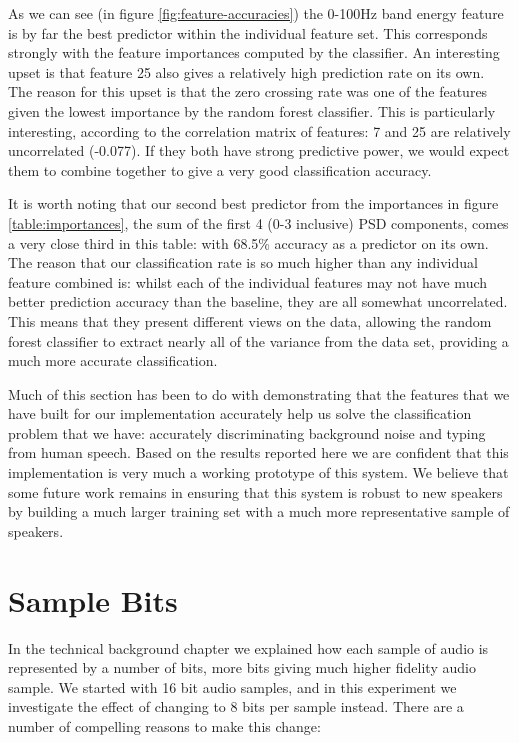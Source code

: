 \documentclass[ %
                    author={Sam Phippen},
                supervisor={Dr. Rafal Bogacz},
                     title={Real time voice activity detectors in noisy personal computing environments},
                  subtitle={},
                    degree={MEng},
                      year={2012} ]{thesis}
\begin{document}
As we can see (in figure \ref{fig:feature-accuracies}) the 0-100Hz band energy
feature is by far the best predictor within the individual feature set. This
corresponds strongly with the feature importances computed by the classifier.
An interesting upset is that feature 25 also gives a relatively high prediction
rate on its own. The reason for this upset is that the zero crossing rate was
one of the features given the lowest importance by the random forest
classifier. This is particularly interesting, according to the correlation
matrix of features: 7 and 25 are relatively uncorrelated (-0.077). If they
both have strong predictive power, we would expect them to combine together to
give a very good classification accuracy.

It is worth noting that our second best predictor from the importances in
figure \ref{table:importances}, the sum of the first 4 (0-3 inclusive) PSD
components, comes a very close third in this table: with 68.5\% accuracy as
a predictor on its own. The reason that our classification rate is so much
higher than any individual feature combined is: whilst each of the individual
features may not have much better prediction accuracy than the baseline, they
are all somewhat uncorrelated. This means that they present different views on
the data, allowing the random forest classifier to extract nearly all of the
variance from the data set, providing a much more accurate classification.

Much of this section has been to do with demonstrating that the features that
we have built for our implementation accurately help us solve the
classification problem that we have: accurately discriminating background noise
and typing from human speech. Based on the results reported here we are
confident that this implementation is very much a working prototype of this
system. We believe that some future work remains in ensuring that this system
is robust to new speakers by building a much larger training set with a much
more representative sample of speakers.

\section{Sample Bits}

In the technical background chapter we explained how each sample of audio is
represented by a number of bits, more bits giving much higher fidelity audio
sample. We started with 16 bit audio samples, and in this experiment we
investigate the effect of changing to 8 bits per sample instead. There are a
number of compelling reasons to make this change:
\end{document}

